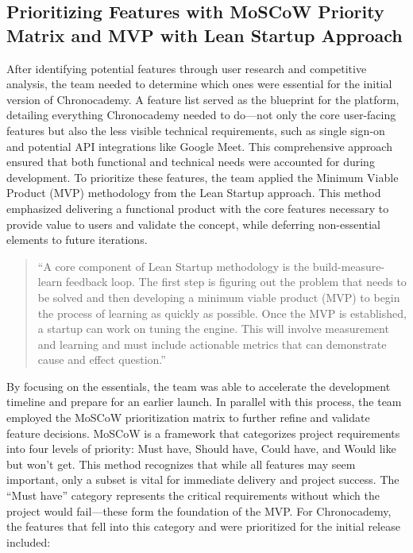\subsection{Prioritizing Features with MoSCoW Priority Matrix and MVP with Lean Startup Approach}\label{subsec:prioritizing-features-with-the-lean-startup-approach}
After identifying potential features through user research and competitive analysis, the team needed to determine which ones were essential for the initial version of Chronocademy.
A feature list served as the blueprint for the platform, detailing everything Chronocademy needed to do—not only the core user-facing features but also the less visible technical requirements, such as single sign-on and potential API integrations like Google Meet.
This comprehensive approach ensured that both functional and technical needs were accounted for during development.
To prioritize these features, the team applied the Minimum Viable Product (MVP) methodology from the Lean Startup approach.
This method emphasized delivering a functional product with the core features necessary to provide value to users and validate the concept, while deferring non-essential elements to future iterations.

\begin{quote}
    ``A core component of Lean Startup methodology is the build-measure-learn feedback loop.
    The first step is figuring out the problem that needs to be solved and then developing a minimum viable product (MVP) to begin the process of learning as quickly as possible.
    Once the MVP is established, a startup can work on tuning the engine.
    This will involve measurement and learning and must include actionable metrics that can demonstrate cause and effect question.''
\end{quote}\cite{leanStartUp}

By focusing on the essentials, the team was able to accelerate the development timeline and prepare for an earlier launch.
In parallel with this process, the team employed the MoSCoW prioritization matrix to further refine and validate feature decisions.
MoSCoW is a framework that categorizes project requirements into four levels of priority: Must have, Should have, Could have, and Would like but won’t get.
This method recognizes that while all features may seem important, only a subset is vital for immediate delivery and project success.\cite{moscowMatrix}
The ``Must have'' category represents the critical requirements without which the project would fail—these form the foundation of the MVP. For Chronocademy, the features that fell into this category and were prioritized for the initial release included:


